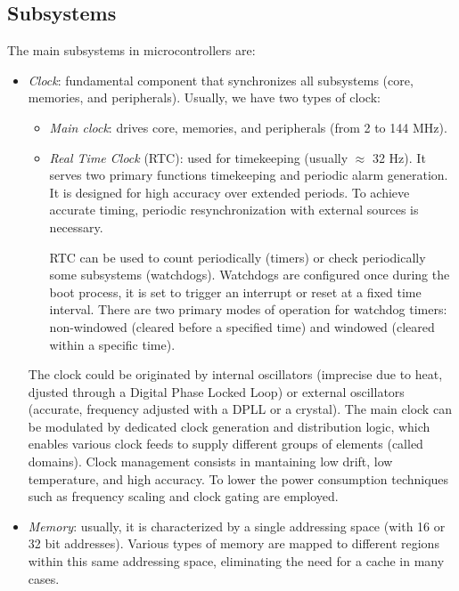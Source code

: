 \subsection{Subsystems}
The main subsystems in microcontrollers are: 
\begin{itemize}
    \item \textit{Clock}: fundamental component that synchronizes all subsystems (core, memories, and peripherals). 
        Usually, we have two types of clock: 
        \begin{itemize}
            \item \textit{Main clock}: drives core, memories, and peripherals (from 2 to 144 MHz). 
            \item \textit{Real Time Clock} (RTC): used for timekeeping (usually $\approx$ 32 Hz). 
                It serves two primary functions timekeeping and periodic alarm generation.
                It is designed for high accuracy over extended periods. 
                To achieve accurate timing, periodic resynchronization with external sources is necessary.
                
                RTC can be used to count periodically (timers) or check periodically some subsystems (watchdogs).
                Watchdogs are configured once during the boot process, it is set to trigger an interrupt or reset at a fixed time interval. 
                There are two primary modes of operation for watchdog timers: non-windowed (cleared before a specified time) and windowed (cleared within a specific time). 
        \end{itemize}
        The clock could be originated by internal oscillators (imprecise due to heat, djusted through a Digital Phase Locked Loop) or external oscillators (accurate, frequency adjusted with a DPLL or a crystal). 
        The main clock can be modulated by dedicated clock generation and distribution logic, which enables various clock feeds to supply different groups of elements (called domains). 
        Clock management consists in mantaining low drift, low temperature, and high accuracy. 
        To lower the power consumption techniques such as frequency scaling and clock gating are employed. 
    \item \textit{Memory}: usually, it is characterized by a single addressing space (with 16 or 32 bit addresses). 
        Various types of memory are mapped to different regions within this same addressing space, eliminating the need for a cache in many cases. 
        

\end{itemize}
